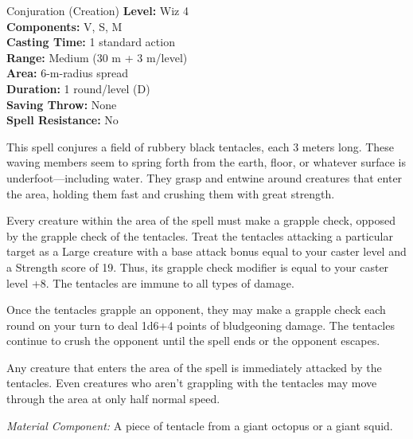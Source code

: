 {Conjuration (Creation)}
{
	\textbf{Level:}
	Wiz 4\\
	\textbf{Components:}
	V, S, M\\
	\textbf{Casting Time:}
	1 standard action\\
	\textbf{Range:}
	Medium (30 m + 3 m/level)\\
	\textbf{Area:}
	6-m-radius spread\\
	\textbf{Duration:}
	1 round/level (D)\\
	\textbf{Saving Throw:}
	None\\
	\textbf{Spell Resistance:}
	No\\
}
{
	This spell conjures a field of rubbery black tentacles, each 3 meters long. These waving members seem to spring forth from the earth, floor, or whatever surface is underfoot---including water. They grasp and entwine around creatures that enter the area, holding them fast and crushing them with great strength.

	Every creature within the area of the spell must make a grapple check, opposed by the grapple check of the tentacles. Treat the tentacles attacking a particular target as a Large creature with a base attack bonus equal to your caster level and a Strength score of 19. Thus, its grapple check modifier is equal to your caster level +8. The tentacles are immune to all types of damage.

	Once the tentacles grapple an opponent, they may make a grapple check each round on your turn to deal 1d6+4 points of bludgeoning damage. The tentacles continue to crush the opponent until the spell ends or the opponent escapes.

	Any creature that enters the area of the spell is immediately attacked by the tentacles. Even creatures who aren't grappling with the tentacles may move through the area at only half normal speed.

	\textit{Material Component:}
	A piece of tentacle from a giant octopus or a giant squid.

}
